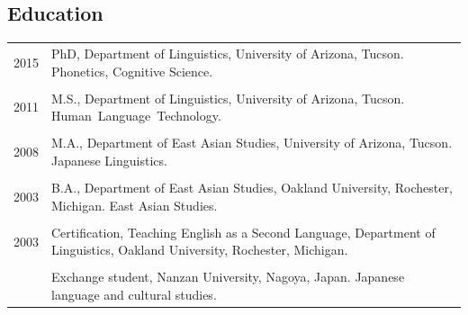 \subsection*{Education}
\noindent
\begin{longtable}{p{} p{}}
	2015 & PhD, Department of Linguistics, University of Arizona, Tucson. Phonetics, Cognitive Science. \\ \\
	2011 & M.S., Department of Linguistics, University of Arizona, Tucson. \mbox{Human Language Technology.} \\ \\
	2008 & M.A., Department of East Asian Studies, University of Arizona, Tucson. Japanese Linguistics. \\ \\
	2003 & B.A., Department of East Asian Studies, Oakland University, Rochester, Michigan. East Asian Studies. \\ \\
	2003 & Certification, Teaching English as a Second Language, Department of Linguistics, Oakland University, Rochester, Michigan. \\ \\
	\daterange{2000}{2002} & Exchange student, Nanzan University, Nagoya, Japan. Japanese language and cultural studies.
\end{longtable}
